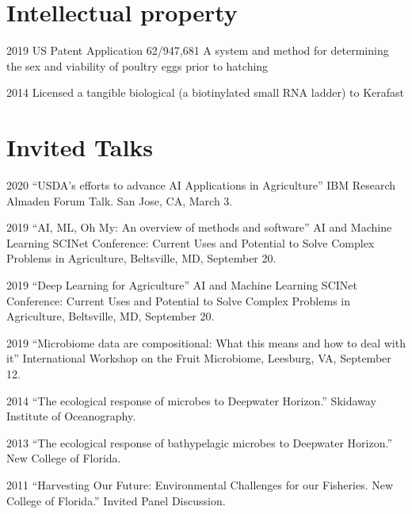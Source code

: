 \documentclass[12pt,letterpaper]{report}
\begin{document}
   \section*{Intellectual property}
          \begin{tablist}
           \item[2019]\tab US  Patent Application 62/947,681 A system and method for determining the sex and viability of poultry eggs prior to hatching\\
          \item[2014]\tab  Licensed a tangible biological (a biotinylated small RNA ladder) to Kerafast
          
          \end{tablist} 
    \section*{Invited Talks}

    \begin{tablist}
    
    	\item[2020] \tab \enquote{USDA's efforts to advance AI Applications in Agriculture} IBM Research Almaden Forum Talk. San Jose, CA,  March 3.

        \item[2019] \tab \enquote{AI, ML, Oh My: An overview of methods and software}  AI and Machine Learning SCINet Conference:  Current Uses and Potential to Solve Complex Problems in Agriculture, Beltsville, MD, September 20.
        
        \item[2019] \tab \enquote{Deep Learning for Agriculture} AI and Machine Learning SCINet Conference:  Current Uses and Potential to Solve Complex Problems in Agriculture,  Beltsville, MD, September 20.
        
        \item[2019] \tab \enquote{Microbiome data are compositional: What this means and how to deal with it} International Workshop on the Fruit Microbiome,  Leesburg, VA, September 12.
        \item[2014] \tab \enquote{The ecological response of microbes to Deepwater Horizon.} Skidaway Institute of Oceanography. 
        \item[2013] \tab \enquote{The ecological response of bathypelagic microbes to Deepwater Horizon.} New College of Florida.
        \item[2011] \tab \enquote{Harvesting Our Future: Environmental Challenges for our Fisheries. New College of Florida.} Invited Panel Discussion.


        
       \end{tablist}
\end{document}
